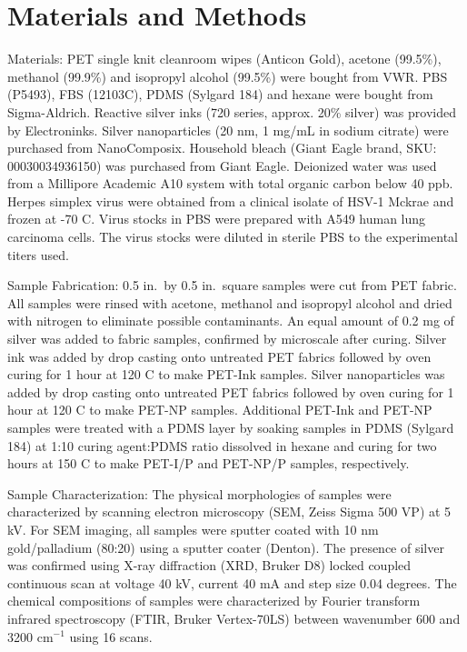 \documentclass[10pt,letterpaper]{article}
\begin{document}
\section*{Materials and Methods}
Materials: PET single knit cleanroom wipes (Anticon Gold), acetone (99.5\%), methanol (99.9\%) and isopropyl alcohol (99.5\%) were bought from VWR.  PBS (P5493), FBS (12103C), PDMS (Sylgard 184) and hexane were bought from Sigma-Aldrich. Reactive silver inks (720 series, approx. 20\% silver) was provided by Electroninks. Silver nanoparticles (20 nm, 1 mg/mL in sodium citrate) were purchased from NanoComposix. Household bleach (Giant Eagle brand, SKU: 00030034936150) was purchased from Giant Eagle. Deionized water was used from a Millipore Academic A10 system with total organic carbon below 40 ppb. Herpes simplex virus were obtained from a clinical isolate of HSV-1 Mckrae and frozen at -70 \degree C. Virus stocks in PBS were prepared with A549 human lung carcinoma cells. The virus stocks were diluted in sterile PBS to the experimental titers used.

Sample Fabrication: 0.5 in.~by 0.5 in.~square samples were cut from PET fabric. All samples were rinsed with acetone, methanol and isopropyl alcohol and dried with nitrogen to eliminate possible contaminants. An equal amount of 0.2 mg of silver was added to fabric samples, confirmed by microscale after curing. Silver ink was added by drop casting onto untreated PET fabrics followed by oven curing for 1 hour at 120 \degree C to make PET-Ink samples. Silver nanoparticles was added by drop casting onto untreated PET fabrics followed by oven curing for 1 hour at 120 \degree C to make PET-NP samples. Additional PET-Ink and PET-NP samples were treated with a PDMS layer by soaking samples in PDMS (Sylgard 184) at 1:10 curing agent:PDMS ratio dissolved in hexane and curing for two hours at 150 \degree C to make PET-I/P and PET-NP/P samples, respectively. 


Sample Characterization: The physical morphologies of samples were characterized by scanning electron microscopy (SEM, Zeiss Sigma 500 VP) at 5 kV. For SEM imaging, all samples were sputter coated with 10 nm gold/palladium (80:20) using a sputter coater (Denton). The presence of silver was confirmed using X-ray diffraction (XRD, Bruker D8) locked coupled continuous scan at voltage 40 kV, current 40 mA and step size 0.04 degrees. The chemical compositions of samples were characterized by Fourier transform infrared spectroscopy (FTIR, Bruker Vertex-70LS) between wavenumber 600 and 3200 cm$^{-1}$  using 16 scans. 
\end{document}
